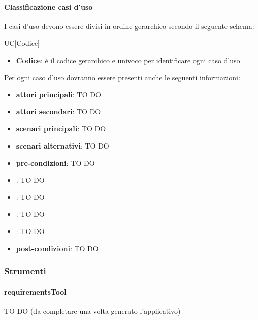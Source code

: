 			\paragraph{Classificazione casi d'uso}
I casi d'uso devono essere divisi in ordine gerarchico secondo il seguente schema: \\
				\begin{center}
					UC[Codice]
				\end{center}
				\begin{itemize}
					\item \textbf{Codice}: è il codice gerarchico e univoco per identificare ogni caso d'uso.
				\end{itemize}
			\noindent Per ogni caso d'uso dovranno essere presenti anche le seguenti informazioni:
				\begin{itemize}
					\item \textbf{attori principali}: TO DO
					\item \textbf{attori secondari}: TO DO
					\item \textbf{scenari principali}: TO DO
					\item \textbf{scenari alternativi}: TO DO
					\item \textbf{pre-condizioni}: TO DO
					\item \textbf{}: TO DO
					\item \textbf{}: TO DO
					\item \textbf{}: TO DO
					\item \textbf{}: TO DO
					\item \textbf{post-condizioni}: TO DO
				\end{itemize}	

		\subsubsection{Strumenti}
			\paragraph{requirementsTool}
TO DO (da completare una volta generato l'applicativo)